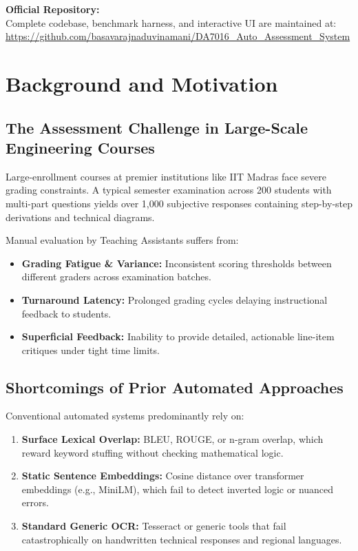\documentclass[11pt,a4paper]{article}
\begin{document}
\begin{recommendation}
    \textbf{Official Repository:} \\
    Complete codebase, benchmark harness, and interactive UI are maintained at: \\
    \url{https://github.com/basavarajnaduvinamani/DA7016_Auto_Assessment_System}
\end{recommendation}

\newpage
\section{Background and Motivation}

\subsection{The Assessment Challenge in Large-Scale Engineering Courses}
Large-enrollment courses at premier institutions like IIT Madras face severe grading constraints. A typical semester examination across 200 students with multi-part questions yields over 1,000 subjective responses containing step-by-step derivations and technical diagrams.

Manual evaluation by Teaching Assistants suffers from:
\begin{itemize}
    \item \textbf{Grading Fatigue \& Variance:} Inconsistent scoring thresholds between different graders across examination batches.
    \item \textbf{Turnaround Latency:} Prolonged grading cycles delaying instructional feedback to students.
    \item \textbf{Superficial Feedback:} Inability to provide detailed, actionable line-item critiques under tight time limits.
\end{itemize}

\subsection{Shortcomings of Prior Automated Approaches}
Conventional automated systems predominantly rely on:
\begin{enumerate}
    \item \textbf{Surface Lexical Overlap:} BLEU, ROUGE, or n-gram overlap, which reward keyword stuffing without checking mathematical logic.
    \item \textbf{Static Sentence Embeddings:} Cosine distance over transformer embeddings (e.g., MiniLM), which fail to detect inverted logic or nuanced errors.
    \item \textbf{Standard Generic OCR:} Tesseract or generic tools that fail catastrophically on handwritten technical responses and regional languages.
\end{enumerate}
\end{document}
